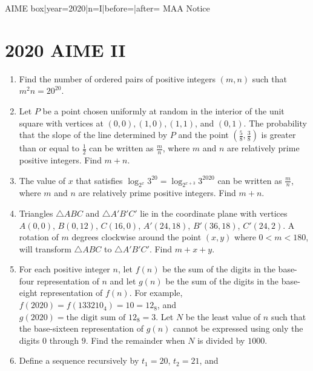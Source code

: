 \documentclass{article}
\begin{document}
\begin{enumerate}[label=\arabic*., itemsep=0.5em]
{{AIME box|year=2020|n=I|before=|after=}}
{{MAA Notice}}\par \vspace{0.5em}\end{enumerate}\newpage\section*{2020 AIME II}\begin{enumerate}[label=\arabic*., itemsep=0.5em]\item Find the number of ordered pairs of positive integers $(m,n)$ such that ${m^2n = 20 ^{20}}$.\par \vspace{0.5em}\item Let $P$ be a point chosen uniformly at random in the interior of the unit square with vertices at $(0,0), (1,0), (1,1)$, and $(0,1)$. The probability that the slope of the line determined by $P$ and the point $\left(\frac58, \frac38 \right)$ is greater than or equal to $\frac12$ can be written as $\frac{m}{n}$, where $m$ and $n$ are relatively prime positive integers. Find $m+n$.\par \vspace{0.5em}\item The value of $x$ that satisfies $\log_{2^x} 3^{20} = \log_{2^{x+3}} 3^{2020}$ can be written as $\frac{m}{n}$, where $m$ and $n$ are relatively prime positive integers. Find $m+n$.\par \vspace{0.5em}\item Triangles $\triangle ABC$ and $\triangle A'B'C'$ lie in the coordinate plane with vertices $A(0,0)$, $B(0,12)$, $C(16,0)$, $A'(24,18)$, $B'(36,18)$, $C'(24,2)$. A rotation of $m$ degrees clockwise around the point $(x,y)$ where $0<m<180$, will transform $\triangle ABC$ to $\triangle A'B'C'$. Find $m+x+y$.\par \vspace{0.5em}\item For each positive integer $n$, let $f(n)$ be the sum of the digits in the base-four representation of $n$ and let $g(n)$ be the sum of the digits in the base-eight representation of $f(n)$. For example, $f(2020) = f(133210_{\text{4}}) = 10 = 12_{\text{8}}$, and $g(2020) = \text{the digit sum of }12_{\text{8}} = 3$. Let $N$ be the least value of $n$ such that the base-sixteen representation of $g(n)$ cannot be expressed using only the digits $0$ through $9$. Find the remainder when $N$ is divided by $1000$.\par \vspace{0.5em}\item Define a sequence recursively by $t_1 = 20$, $t_2 = 21$, and

\end{enumerate}
\end{document}
